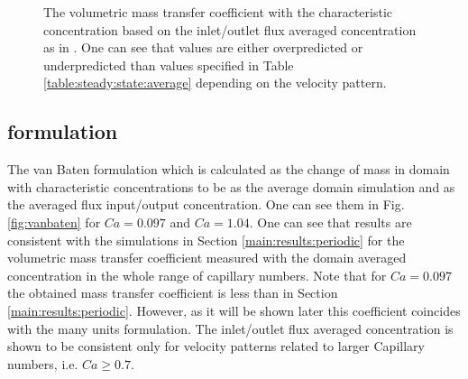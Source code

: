 \documentclass{article}
\begin{document}
\begin{figure}[htb!]
\caption{The volumetric mass transfer coefficient
with the characteristic concentration based on
the inlet/outlet flux averaged concentration as
in \cite{vanbaten-circular}. One can see that values are either overpredicted or underpredicted
than values specified in Table \ref{table:steady:state:average} depending on the velocity pattern. 
\label{fig:volumetric:char:concentration:vanbaten}}
\end{figure}



\subsection{\citeauthor{vanbaten-circular} formulation}
The van Baten formulation which is calculated as the change of mass in domain with characteristic
concentrations to be as the average domain simulation and as the averaged flux input/output
concentration. One can see them in Fig. \ref{fig:vanbaten} for $Ca=0.097$ and
$Ca=1.04$. One can see that results are consistent with the simulations in Section
\ref{main:results:periodic} for the volumetric mass transfer coefficient measured with the domain
averaged concentration in the whole range of capillary numbers. Note that for $Ca=0.097$ the
obtained mass transfer coefficient is less than in Section \ref{main:results:periodic}. However, as
it will be shown later this coefficient coincides with the many units formulation. The inlet/outlet
flux averaged concentration is shown to be consistent only for velocity patterns related to larger
Capillary numbers, i.e. $Ca\geq0.7$. 
\end{document}
